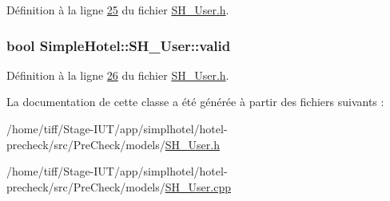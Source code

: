 Définition à la ligne \hyperlink{SH__User_8h_source_l00025}{25} du fichier \hyperlink{SH__User_8h_source}{S\-H\-\_\-\-User.\-h}.

\hypertarget{classSimpleHotel_1_1SH__User_ae1973ccbefacafb374919b5689109bf2}{
\subsubsection[{valid}]{\setlength{\rightskip}{0pt plus 5cm}bool Simple\-Hotel\-::\-S\-H\-\_\-\-User\-::valid\hspace{0.3cm}{\ttfamily [read]}}}\label{classSimpleHotel_1_1SH__User_ae1973ccbefacafb374919b5689109bf2}


Définition à la ligne \hyperlink{SH__User_8h_source_l00026}{26} du fichier \hyperlink{SH__User_8h_source}{S\-H\-\_\-\-User.\-h}.



La documentation de cette classe a été générée à partir des fichiers suivants \-:\begin{DoxyCompactItemize}
\item 
/home/tiff/\-Stage-\/\-I\-U\-T/app/simplhotel/hotel-\/precheck/src/\-Pre\-Check/models/\hyperlink{SH__User_8h}{S\-H\-\_\-\-User.\-h}\item 
/home/tiff/\-Stage-\/\-I\-U\-T/app/simplhotel/hotel-\/precheck/src/\-Pre\-Check/models/\hyperlink{SH__User_8cpp}{S\-H\-\_\-\-User.\-cpp}\end{DoxyCompactItemize}
